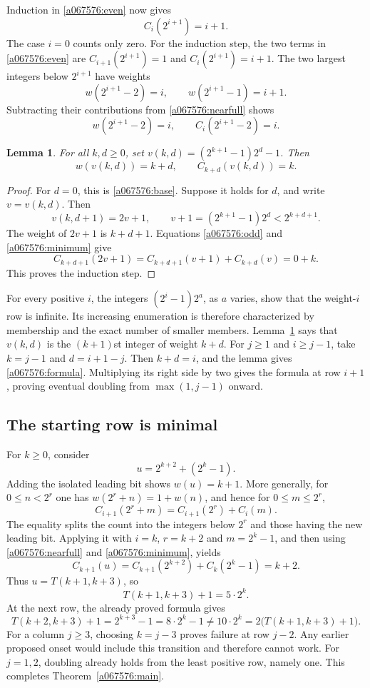 \documentclass[11pt]{article}
\newtheorem{lemma}[theorem]{Lemma}
\begin{document}
Induction in \eqref{a067576:even} now gives
\begin{equation}\label{a067576:nearfull}
 C_i(2^{i+1})=i+1.
\end{equation}
The case $i=0$ counts only zero. For the induction step, the two terms
in \eqref{a067576:even} are $C_{i+1}(2^{i+1})=1$ and
$C_i(2^{i+1})=i+1$. The two largest integers below $2^{i+1}$ have
weights
\[
 w(2^{i+1}-2)=i,\qquad w(2^{i+1}-1)=i+1.
\]
Subtracting their contributions from \eqref{a067576:nearfull} shows
\begin{equation}\label{a067576:base}
 w(2^{i+1}-2)=i,\qquad C_i(2^{i+1}-2)=i.
\end{equation}

\begin{lemma}\label{a067576:rank}
For all $k,d\ge0$, set $v(k,d)=(2^{k+1}-1)2^d-1$. Then
\[
 w(v(k,d))=k+d,\qquad C_{k+d}(v(k,d))=k.
\]
\end{lemma}
\begin{proof}
For $d=0$, this is \eqref{a067576:base}. Suppose it holds for $d$,
and write $v=v(k,d)$. Then
\[
 v(k,d+1)=2v+1,\qquad
 v+1=(2^{k+1}-1)2^d<2^{k+d+1}.
\]
The weight of $2v+1$ is $k+d+1$. Equations
\eqref{a067576:odd} and \eqref{a067576:minimum} give
\[
 C_{k+d+1}(2v+1)
 =C_{k+d+1}(v+1)+C_{k+d}(v)=0+k.
\]
This proves the induction step.
\end{proof}

For every positive $i$, the integers $(2^i-1)2^a$, as $a$ varies, show
that the weight-$i$ row is infinite. Its increasing enumeration is
therefore characterized by membership and the exact number of smaller
members. Lemma~\ref{a067576:rank} says that $v(k,d)$ is the $(k+1)$st
integer of weight $k+d$. For $j\ge1$ and $i\ge j-1$, take
$k=j-1$ and $d=i+1-j$. Then $k+d=i$, and the lemma gives
\eqref{a067576:formula}. Multiplying its right side by two gives the
formula at row $i+1$, proving eventual doubling from
$\max(1,j-1)$ onward.

\subsection*{The starting row is minimal}
For $k\ge0$, consider
\[
 u=2^{k+2}+(2^k-1).
\]
Adding the isolated leading bit shows $w(u)=k+1$. More generally, for
$0\le n<2^r$ one has $w(2^r+n)=1+w(n)$, and hence for
$0\le m\le2^r$,
\begin{equation}\label{a067576:leading}
 C_{i+1}(2^r+m)=C_{i+1}(2^r)+C_i(m).
\end{equation}
The equality splits the count into the integers below $2^r$ and those
having the new leading bit. Applying it with $i=k$, $r=k+2$ and
$m=2^k-1$, and then using \eqref{a067576:nearfull} and
\eqref{a067576:minimum}, yields
\[
 C_{k+1}(u)=C_{k+1}(2^{k+2})+C_k(2^k-1)=k+2.
\]
Thus $u=T(k+1,k+3)$, so
\[
 T(k+1,k+3)+1=5\cdot2^k.
\]
At the next row, the already proved formula gives
\[
 T(k+2,k+3)+1=2^{k+3}-1=8\cdot2^k-1
 \ne10\cdot2^k=2\bigl(T(k+1,k+3)+1\bigr).
\]
For a column $j\ge3$, choosing $k=j-3$ proves failure at row $j-2$.
Any earlier proposed onset would include this transition and therefore
cannot work. For $j=1,2$, doubling already holds from the least positive
row, namely one. This completes Theorem~\ref{a067576:main}.
\end{document}
